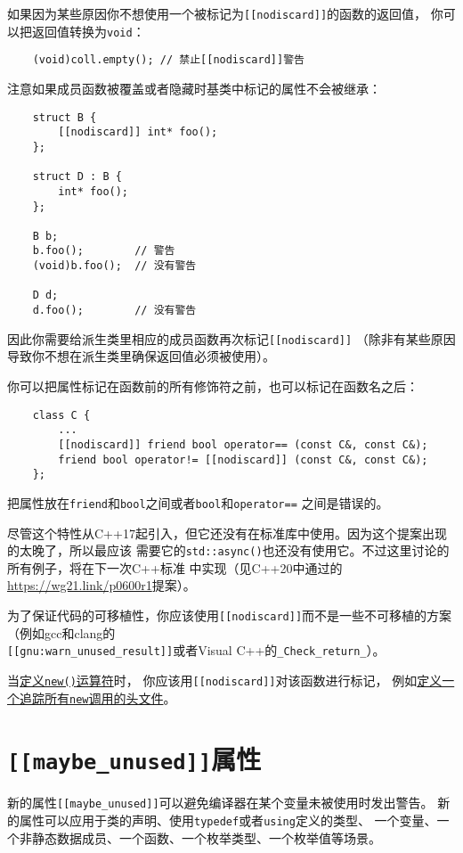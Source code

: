 如果因为某些原因你不想使用一个被标记为\texttt{[[nodiscard]]}的函数的返回值，
你可以把返回值转换为\texttt{void}：
\begin{lstlisting}
    (void)coll.empty(); // 禁止[[nodiscard]]警告
\end{lstlisting}
注意如果成员函数被覆盖或者隐藏时基类中标记的属性不会被继承：
\begin{lstlisting}
    struct B {
        [[nodiscard]] int* foo();
    };

    struct D : B {
        int* foo();
    };

    B b;
    b.foo();        // 警告
    (void)b.foo();  // 没有警告

    D d;
    d.foo();        // 没有警告
\end{lstlisting}
因此你需要给派生类里相应的成员函数再次标记\texttt{[[nodiscard]]}
（除非有某些原因导致你不想在派生类里确保返回值必须被使用）。

你可以把属性标记在函数前的所有修饰符之前，也可以标记在函数名之后：
\begin{lstlisting}
    class C {
        ...
        [[nodiscard]] friend bool operator== (const C&, const C&);
        friend bool operator!= [[nodiscard]] (const C&, const C&);
    };
\end{lstlisting}
把属性放在\texttt{friend}和\texttt{bool}之间或者\texttt{bool}和\texttt{operator==}
之间是错误的。

尽管这个特性从C++17起引入，但它还没有在标准库中使用。因为这个提案出现的太晚了，所以最应该
需要它的\texttt{std::async()}也还没有使用它。不过这里讨论的所有例子，将在下一次C++标准
中实现（见C++20中通过的\url{https://wg21.link/p0600r1}提案）。

为了保证代码的可移植性，你应该使用\texttt{[[nodiscard]]}而不是一些不可移植的方案
（例如gcc和clang的\\
\texttt{[[gnu:warn\_unused\_result]]}或者Visual C++的\texttt{\_Check\_return\_}）。

当\hyperref[ch30.2.2]{定义\texttt{new()}运算符}时，
你应该用\texttt{[[nodiscard]]}对该函数进行标记，
例如\hyperref[ch30.4]{定义一个追踪所有\texttt{new}调用的头文件}。

\section{\texttt{[[maybe\_unused]]}属性}
新的属性\texttt{[[maybe\_unused]]}可以避免编译器在某个变量未被使用时发出警告。
新的属性可以应用于类的声明、使用\texttt{typedef}或者\texttt{using}定义的类型、
一个变量、一个非静态数据成员、一个函数、一个枚举类型、一个枚举值等场景。


